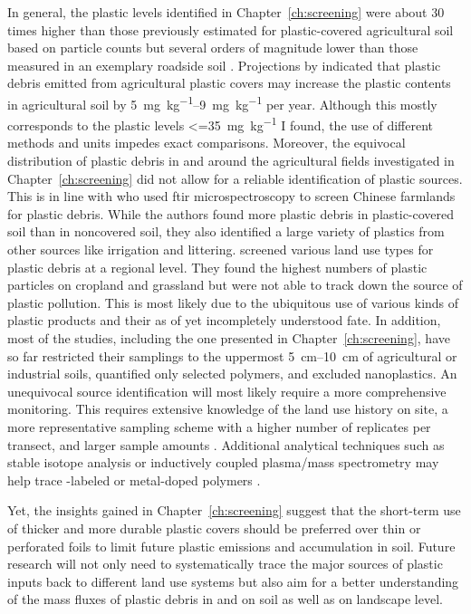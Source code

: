 In general, the plastic levels identified in Chapter~\ref{ch:screening} were about \num{30} times higher than those previously estimated for plastic-covered agricultural soil based on particle counts \citep{BuksGlobal2020} but several orders of magnitude lower than those measured in an exemplary roadside soil \citep{DierkesQuantification2019}. Projections by \citet{BrandesIdentifying2021} indicated that plastic debris emitted from agricultural plastic covers may increase the plastic contents in agricultural soil by \SIrange{5}{9}{\milli\gram\per\kilo\gram} per year.
Although this mostly corresponds to the plastic levels \SI{<=35}{\milli\gram\per\kilo\gram} I found, the use of different methods and units impedes exact comparisons. Moreover, the equivocal distribution of plastic debris in and around the agricultural fields investigated in Chapter~\ref{ch:screening} did not allow for a reliable identification of plastic sources. This is in line with \citet{ZhouMicroplastics2020} who used \ac{ftir} microspectroscopy to screen Chinese farmlands for plastic debris. While the authors found more plastic debris in plastic-covered soil than in noncovered soil, they also identified a large variety of plastics from other sources like irrigation and littering.
 screened various land use types for plastic debris at a regional level. They found the highest numbers of plastic particles on cropland and grassland but were not able to track down the source of plastic pollution.
This is most likely due to the ubiquitous use of various kinds of plastic products and their as of yet incompletely understood fate. In addition, most of the studies, including the one presented in Chapter~\ref{ch:screening}, have so far restricted their samplings to the uppermost \SIrange{5}{10}{\centi\meter} of agricultural or industrial soils, quantified only selected polymers, and excluded nanoplastics. An unequivocal source identification will most likely require a more comprehensive monitoring. This requires extensive knowledge of the land use history on site, a more representative sampling scheme with a higher number of replicates per transect, and larger sample amounts \citep[Section~\ref{sec:general-discussion:analytics};][]{YuHow2021}. Additional analytical techniques such as stable isotope analysis or inductively coupled plasma\slash mass spectrometry may help trace -labeled or metal-doped polymers \citep{MitranoSynthesis2019}.

Yet, the insights gained in Chapter~\ref{ch:screening} suggest that the short-term use of thicker and more durable plastic covers should be preferred over thin or perforated foils to limit future plastic emissions and accumulation in soil. Future research will not only need to systematically trace the major sources of plastic inputs back to different land use systems but also aim for a better understanding of the mass fluxes of plastic debris in and on soil as well as on landscape level.

